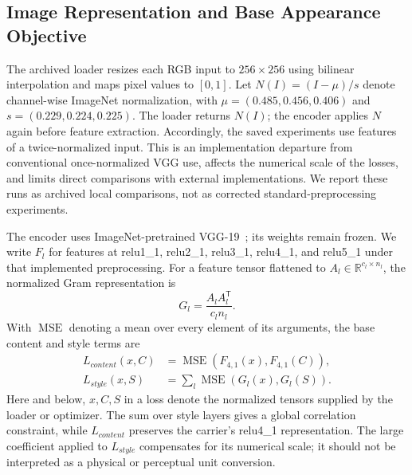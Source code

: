 \subsection{Image Representation and Base Appearance Objective}
The archived loader resizes each RGB input to $256\times256$ using bilinear interpolation and maps pixel values to $[0,1]$. Let $N(I)=(I-\mu)/s$ denote channel-wise ImageNet normalization, with $\mu=(0.485,0.456,0.406)$ and $s=(0.229,0.224,0.225)$. The loader returns $N(I)$; the encoder applies $N$ again before feature extraction. Accordingly, the saved experiments use features of a twice-normalized input. This is an implementation departure from conventional once-normalized VGG use, affects the numerical scale of the losses, and limits direct comparisons with external implementations. We report these runs as archived local comparisons, not as corrected standard-preprocessing experiments.

The encoder uses ImageNet-pretrained VGG-19~\cite{simonyan2014}; its weights remain frozen. We write $F_l$ for features at relu1\_1, relu2\_1, relu3\_1, relu4\_1, and relu5\_1 under that implemented preprocessing. For a feature tensor flattened to $A_l\in\mathbb{R}^{c_l\times n_l}$, the normalized Gram representation is
\begin{equation}
G_l=\frac{A_l A_l^{\mathsf T}}{c_l n_l}.
\end{equation}
With $\operatorname{MSE}$ denoting a mean over every element of its arguments, the base content and style terms are
\begin{align}
L_{content}(x,C)&=\operatorname{MSE}(F_{4,1}(x),F_{4,1}(C)),\\
L_{style}(x,S)&=\sum_{l}\operatorname{MSE}(G_l(x),G_l(S)).
\end{align}
Here and below, $x,C,S$ in a loss denote the normalized tensors supplied by the loader or optimizer. The sum over style layers gives a global correlation constraint, while $L_{content}$ preserves the carrier's relu4\_1 representation. The large coefficient applied to $L_{style}$ compensates for its numerical scale; it should not be interpreted as a physical or perceptual unit conversion.

